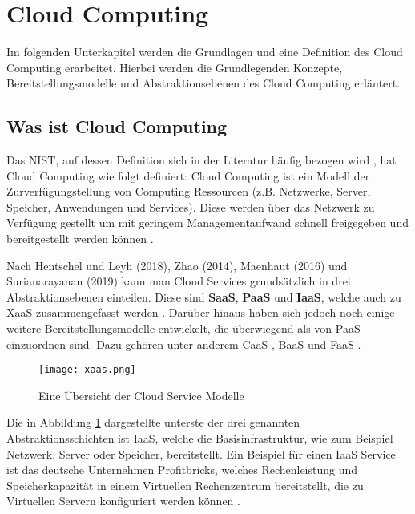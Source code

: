 \section{Cloud Computing}
\label{sec:cloud-computing}

Im folgenden Unterkapitel werden die Grundlagen und eine Definition des Cloud Computing erarbeitet. Hierbei werden die Grundlegenden Konzepte, Bereitstellungsmodelle und Abstraktionsebenen des Cloud Computing erläutert.

\subsection{Was ist Cloud Computing}

Das \ac{NIST}, auf dessen Definition sich in der Literatur häufig bezogen wird \cite[Vgl.][S. 4f]{Reinheimer2018}, hat Cloud Computing wie folgt definiert: Cloud Computing ist ein Modell der Zurverfügungstellung von Computing Ressourcen (z.B. Netzwerke, Server, Speicher, Anwendungen und Services). Diese werden über das Netzwerk zu Verfügung gestellt um mit geringem Managementaufwand schnell freigegeben und bereitgestellt werden können \cite[Vgl.][S. 2]{Mell2011}\cite[Vgl.][S. 5]{Reinheimer2018}.

Nach Hentschel und Leyh (2018), Zhao (2014), Maenhaut (2016) und Surianarayanan (2019) kann man Cloud Services grundsätzlich in drei Abstraktionsebenen einteilen. Diese sind \textbf{\ac{SaaS}}, \textbf{\ac{PaaS}} und \textbf{\ac{IaaS}}, welche auch zu \ac{XaaS} zusammengefasst werden \cite[Vgl.][S. 9]{Reinheimer2018}\cite[Vgl.][S. 143f]{Zhao2014}\cite[Vgl.][S. 32ff]{Maenhaut2016}\cite[Vgl.][S. 226ff]{Surianarayanan2019}. Darüber hinaus haben sich jedoch noch einige weitere Bereitstellungsmodelle entwickelt, die überwiegend als \grqq{} von \ac{PaaS} einzuordnen sind. Dazu gehören unter anderem \ac{CaaS} \cite[Vgl.][]{Luber2019}, \ac{BaaS} und \ac{FaaS} \cite[Vgl.][]{Luber2022}.

\begin{figure}[H]
    \centering
    \texttt{[image: xaas.png]}
    \caption{Eine Übersicht der Cloud Service Modelle \cite[Eigene Darstellung nach][S. 33]{Maenhaut2016}\cite[Ergänzt durch][]{Toroman2018}}
    \label{fig:XaaS}
\end{figure}

Die in Abbildung \ref{fig:XaaS} dargestellte unterste der drei genannten Abstraktionsschichten ist \ac{IaaS}, welche die Basisinfrastruktur, wie zum Beispiel Netzwerk, Server oder Speicher, bereitstellt. Ein Beispiel für einen \ac{IaaS} Service ist das deutsche Unternehmen Profitbricks, welches Rechenleistung und Speicherkapazität in einem Virtuellen Rechenzentrum bereitstellt, die zu Virtuellen Servern konfiguriert werden können \cite[Vgl.][S. 12]{Reinheimer2018}.

